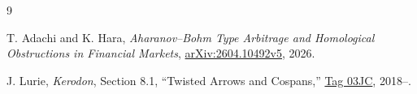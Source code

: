 \documentclass[11pt,a4paper]{article}
\begin{document}
\begin{thebibliography}{9}

T. Adachi and K. Hara,
\emph{Aharanov--Bohm Type Arbitrage and Homological Obstructions in Financial Markets},
\href{https://arxiv.org/abs/2604.10492v5}{arXiv:2604.10492v5}, 2026.



J. Lurie,
\emph{Kerodon}, Section 8.1, ``Twisted Arrows and Cospans,''
\href{https://kerodon.net/tag/03JC}{Tag 03JC}, 2018--.

\end{thebibliography}
\end{document}
